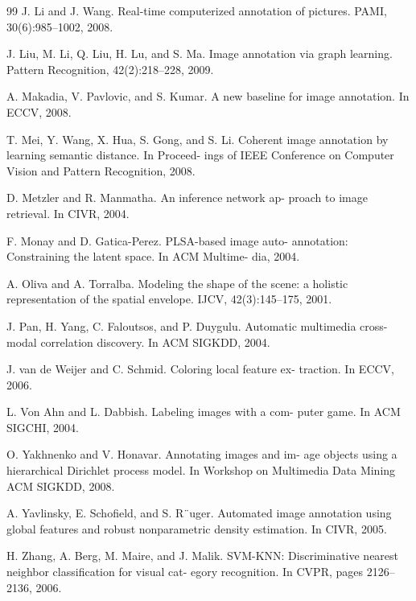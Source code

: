 \documentclass[a4paper,twocolumn]{ctexart}
\begin{document}
\begin{thebibliography} {99}
J. Li and J. Wang. Real-time computerized annotation of
pictures. PAMI, 30(6):985–1002, 2008.

J. Liu, M. Li, Q. Liu, H. Lu, and S. Ma. Image annotation via
graph learning. Pattern Recognition, 42(2):218–228, 2009.

A. Makadia, V. Pavlovic, and S. Kumar. A new baseline for
image annotation. In ECCV, 2008.

T. Mei, Y. Wang, X. Hua, S. Gong, and S. Li. Coherent
image annotation by learning semantic distance. In Proceed-
ings of IEEE Conference on Computer Vision and Pattern
Recognition, 2008.

D. Metzler and R. Manmatha. An inference network ap-
proach to image retrieval. In CIVR, 2004.

F. Monay and D. Gatica-Perez. PLSA-based image auto-
annotation: Constraining the latent space. In ACM Multime-
dia, 2004.

A. Oliva and A. Torralba. Modeling the shape of the scene:
a holistic representation of the spatial envelope. IJCV,
42(3):145–175, 2001.

J. Pan, H. Yang, C. Faloutsos, and P. Duygulu. Automatic
multimedia cross-modal correlation discovery. In ACM
SIGKDD, 2004.

J. van de Weijer and C. Schmid. Coloring local feature ex-
traction. In ECCV, 2006.

L. Von Ahn and L. Dabbish. Labeling images with a com-
puter game. In ACM SIGCHI, 2004.

O. Yakhnenko and V. Honavar. Annotating images and im-
age objects using a hierarchical Dirichlet process model.
In Workshop on Multimedia Data Mining ACM SIGKDD,
2008.

A. Yavlinsky, E. Schoﬁeld, and S. R¨uger. Automated image
annotation using global features and robust nonparametric
density estimation. In CIVR, 2005.

H. Zhang, A. Berg, M. Maire, and J. Malik. SVM-KNN:
Discriminative nearest neighbor classiﬁcation for visual cat-
egory recognition. In CVPR, pages 2126–2136, 2006.

\end{thebibliography}
\end{document}
